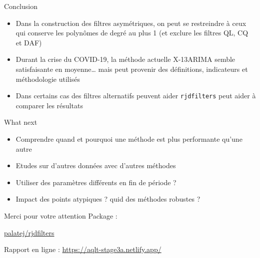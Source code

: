 \documentclass[10pt,xcolor=table,color={dvipsnames,usenames},ignorenonframetext,usepdftitle=false,french]{beamer}
\providecommand{\tightlist}{%
  \setlength{\parskip}{0pt}
  }
\newcommand\1{\mathds{1}}
\begin{document}
\begin{frame}[fragile]{Conclusion}
\protect\hypertarget{conclusion-2}{}
\begin{itemize}
\tightlist
\item
  Dans la construction des filtres asymétriques, on peut se restreindre
  à ceux qui conserve les polynômes de degré au plus 1 (et exclure les
  filtres QL, CQ et DAF)
\end{itemize}

\bigskip

\pause

\begin{itemize}
\tightlist
\item
  Durant la crise du COVID-19, la méthode actuelle X-13ARIMA semble
  satisfaisante en moyenne\ldots{} \pause mais peut provenir des
  définitions, indicateurs et méthodologie utilisés
\end{itemize}

\bigskip

\pause

\begin{itemize}
\tightlist
\item
  Dans certains cas des filtres alternatifs peuvent aider
   \texttt{rjdfilters} peut aider à comparer
  les résultats
\end{itemize}
\end{frame}

\begin{frame}{What next\bcquestion}
\protect\hypertarget{what-next}{}
\begin{itemize}
\tightlist
\item
  Comprendre quand et pourquoi une méthode est plus performante qu'une
  autre
\end{itemize}

\pause

\begin{itemize}
\tightlist
\item
  Etudes sur d'autres données avec d'autres méthodes
\end{itemize}

\pause

\begin{itemize}
\tightlist
\item
  Utiliser des paramètres différents en fin de période ?
\end{itemize}

\pause

\begin{itemize}
\tightlist
\item
  Impact des points atypiques ? quid des méthodes robustes ?
\end{itemize}
\end{frame}

\begin{frame}{Merci pour votre attention}
\protect\hypertarget{merci-pour-votre-attention}{}
Package :

\href{https://github.com/palatej/rjdfilters}{\faGithub{} palatej/rjdfilters}

 Rapport en ligne :
\url{https://aqlt-stage3a.netlify.app/}
\end{frame}
\end{document}
